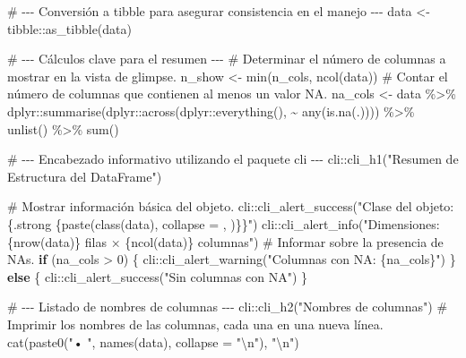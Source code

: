 \documentclass[
  letterpaper,
  DIV=11,
  numbers=noendperiod]{scrartcl}
\newenvironment{Shaded}{\begin{snugshade}}{\end{snugshade}}
\newcommand{\AttributeTok}[1]{\textcolor[rgb]{0.40,0.45,0.13}{#1}}
\newcommand{\CommentTok}[1]{\textcolor[rgb]{0.37,0.37,0.37}{#1}}
\newcommand{\ControlFlowTok}[1]{\textcolor[rgb]{0.00,0.23,0.31}{\textbf{#1}}}
\newcommand{\DecValTok}[1]{\textcolor[rgb]{0.68,0.00,0.00}{#1}}
\newcommand{\FunctionTok}[1]{\textcolor[rgb]{0.28,0.35,0.67}{#1}}
\newcommand{\NormalTok}[1]{\textcolor[rgb]{0.00,0.23,0.31}{#1}}
\newcommand{\OtherTok}[1]{\textcolor[rgb]{0.00,0.23,0.31}{#1}}
\newcommand{\SpecialCharTok}[1]{\textcolor[rgb]{0.37,0.37,0.37}{#1}}
\newcommand{\StringTok}[1]{\textcolor[rgb]{0.13,0.47,0.30}{#1}}
\begin{document}
\begin{Shaded}
\begin{Highlighting}[]
  \CommentTok{\# {-}{-}{-} Conversión a tibble para asegurar consistencia en el manejo {-}{-}{-}}
\NormalTok{  data }\OtherTok{\textless{}{-}}\NormalTok{ tibble}\SpecialCharTok{::}\FunctionTok{as\_tibble}\NormalTok{(data)}
  
  \CommentTok{\# {-}{-}{-} Cálculos clave para el resumen {-}{-}{-}}
  \CommentTok{\# Determinar el número de columnas a mostrar en la vista de glimpse.}
\NormalTok{  n\_show }\OtherTok{\textless{}{-}} \FunctionTok{min}\NormalTok{(n\_cols, }\FunctionTok{ncol}\NormalTok{(data))}
  \CommentTok{\# Contar el número de columnas que contienen al menos un valor NA.}
\NormalTok{  na\_cols }\OtherTok{\textless{}{-}}\NormalTok{ data }\SpecialCharTok{\%\textgreater{}\%}
\NormalTok{    dplyr}\SpecialCharTok{::}\FunctionTok{summarise}\NormalTok{(dplyr}\SpecialCharTok{::}\FunctionTok{across}\NormalTok{(dplyr}\SpecialCharTok{::}\FunctionTok{everything}\NormalTok{(), }\SpecialCharTok{\textasciitilde{}} \FunctionTok{any}\NormalTok{(}\FunctionTok{is.na}\NormalTok{(.)))) }\SpecialCharTok{\%\textgreater{}\%}
    \FunctionTok{unlist}\NormalTok{() }\SpecialCharTok{\%\textgreater{}\%}
    \FunctionTok{sum}\NormalTok{()}
  
  \CommentTok{\# {-}{-}{-} Encabezado informativo utilizando el paquete \textasciigrave{}cli\textasciigrave{} {-}{-}{-}}
\NormalTok{  cli}\SpecialCharTok{::}\FunctionTok{cli\_h1}\NormalTok{(}\StringTok{"Resumen de Estructura del DataFrame"}\NormalTok{)}
  
  \CommentTok{\# Mostrar información básica del objeto.}
\NormalTok{  cli}\SpecialCharTok{::}\FunctionTok{cli\_alert\_success}\NormalTok{(}\StringTok{"Clase del objeto: \{.strong \{paste(class(data), collapse = \textquotesingle{}, \textquotesingle{})\}\}"}\NormalTok{)}
\NormalTok{  cli}\SpecialCharTok{::}\FunctionTok{cli\_alert\_info}\NormalTok{(}\StringTok{"Dimensiones: \{nrow(data)\} filas × \{ncol(data)\} columnas"}\NormalTok{)}
  \CommentTok{\# Informar sobre la presencia de NAs.}
  \ControlFlowTok{if}\NormalTok{ (na\_cols }\SpecialCharTok{\textgreater{}} \DecValTok{0}\NormalTok{) \{}
\NormalTok{    cli}\SpecialCharTok{::}\FunctionTok{cli\_alert\_warning}\NormalTok{(}\StringTok{"Columnas con NA: \{na\_cols\}"}\NormalTok{)}
\NormalTok{  \} }\ControlFlowTok{else}\NormalTok{ \{}
\NormalTok{    cli}\SpecialCharTok{::}\FunctionTok{cli\_alert\_success}\NormalTok{(}\StringTok{"Sin columnas con NA"}\NormalTok{)}
\NormalTok{  \}}
  
  \CommentTok{\# {-}{-}{-} Listado de nombres de columnas {-}{-}{-}}
\NormalTok{  cli}\SpecialCharTok{::}\FunctionTok{cli\_h2}\NormalTok{(}\StringTok{"Nombres de columnas"}\NormalTok{)}
  \CommentTok{\# Imprimir los nombres de las columnas, cada una en una nueva línea.}
  \FunctionTok{cat}\NormalTok{(}\FunctionTok{paste0}\NormalTok{(}\StringTok{"• "}\NormalTok{, }\FunctionTok{names}\NormalTok{(data), }\AttributeTok{collapse =} \StringTok{"}\SpecialCharTok{\textbackslash{}n}\StringTok{"}\NormalTok{), }\StringTok{"}\SpecialCharTok{\textbackslash{}n}\StringTok{"}\NormalTok{)}
  

\end{Highlighting}
\end{Shaded}
\end{document}
